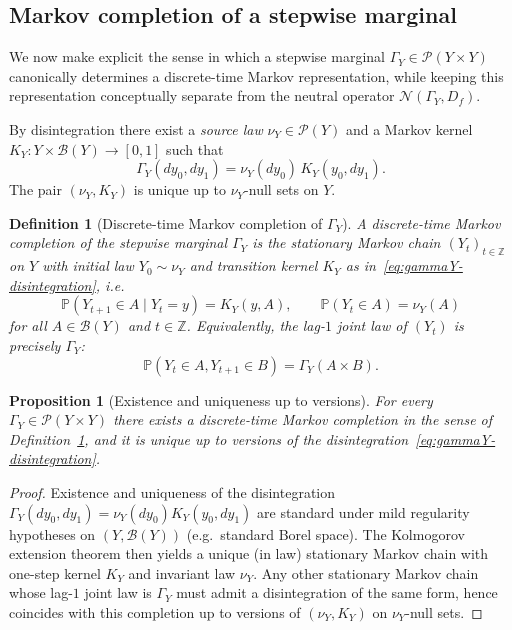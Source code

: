 \documentclass[11pt]{article}
\newtheorem{definition}{Definition}
\newtheorem{proposition}{Proposition}
\newcommand{\Pcal}{\mathcal{P}}
\newcommand{\Ncal}{\mathcal{N}}
\newcommand{\Bcal}{\mathcal{B}}
\newcommand{\Pbb}{\mathbb{P}}
\begin{document}
\subsection{Markov completion of a stepwise marginal}
\label{subsec:markov-completion-discrete}

We now make explicit the sense in which a stepwise marginal
$\Gamma_Y\in\Pcal(Y\times Y)$ canonically determines a discrete-time
Markov representation, while keeping this representation conceptually
separate from the neutral operator $\Ncal(\Gamma_Y,D_f)$.

By disintegration there exist a \emph{source law}
$\nu_Y\in \Pcal(Y)$ and a Markov kernel $K_Y:Y\times\Bcal(Y)\to[0,1]$
such that
\begin{equation}
  \Gamma_Y(dy_0,dy_1)
  = \nu_Y(dy_0)\,K_Y(y_0,dy_1).
  \label{eq:gammaY-disintegration}
\end{equation}
The pair $(\nu_Y,K_Y)$ is unique up to $\nu_Y$-null sets on $Y$.

\begin{definition}[Discrete-time Markov completion of $\Gamma_Y$]
\label{def:discrete-markov-completion}
A \emph{discrete-time Markov completion} of the stepwise marginal
$\Gamma_Y$ is the stationary Markov chain
$(Y_t)_{t\in\mathbb{Z}}$ on $Y$ with initial law $Y_0\sim\nu_Y$ and
transition kernel $K_Y$ as in~\eqref{eq:gammaY-disintegration}, i.e.
\[
  \Pbb(Y_{t+1}\in A \mid Y_t = y)
  = K_Y(y,A),
  \qquad
  \Pbb(Y_t\in A) = \nu_Y(A)
\]
for all $A\in\Bcal(Y)$ and $t\in\mathbb{Z}$. Equivalently, the lag-$1$
joint law of $(Y_t)$ is precisely $\Gamma_Y$:
\[
  \Pbb(Y_t\in A, Y_{t+1}\in B)
  = \Gamma_Y(A\times B).
\]
\end{definition}

\begin{proposition}[Existence and uniqueness up to versions]
\label{prop:discrete-markov-completion-uniq}
For every $\Gamma_Y\in\Pcal(Y\times Y)$ there exists a discrete-time
Markov completion in the sense of
Definition~\ref{def:discrete-markov-completion}, and it is unique up to
versions of the disintegration~\eqref{eq:gammaY-disintegration}.
\end{proposition}

\begin{proof}
Existence and uniqueness of the disintegration
$\Gamma_Y(dy_0,dy_1) = \nu_Y(dy_0)K_Y(y_0,dy_1)$ are standard under
mild regularity hypotheses on $(Y,\Bcal(Y))$ (e.g.\ standard Borel
space). The Kolmogorov extension theorem then yields a unique (in law)
stationary Markov chain with one-step kernel $K_Y$ and invariant law
$\nu_Y$. Any other stationary Markov chain whose lag-$1$ joint law is
$\Gamma_Y$ must admit a disintegration of the same form, hence coincides
with this completion up to versions of $(\nu_Y,K_Y)$ on $\nu_Y$-null
sets.
\end{proof}
\end{document}
